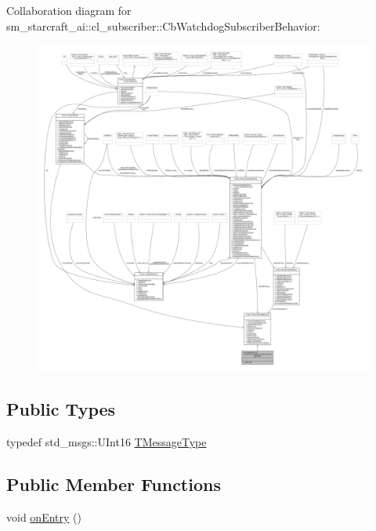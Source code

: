 Collaboration diagram for sm\+\_\+starcraft\+\_\+ai\+:\+:cl\+\_\+subscriber\+:\+:Cb\+Watchdog\+Subscriber\+Behavior\+:
\nopagebreak
\begin{figure}[H]
\begin{center}
\leavevmode
\includegraphics[width=350pt]{classsm__starcraft__ai_1_1cl__subscriber_1_1CbWatchdogSubscriberBehavior__coll__graph}
\end{center}
\end{figure}
\subsection*{Public Types}
\begin{DoxyCompactItemize}
\item 
typedef std\+\_\+msgs\+::\+U\+Int16 \hyperlink{classsm__starcraft__ai_1_1cl__subscriber_1_1CbWatchdogSubscriberBehavior_a0257cda4ee2d761bd71bbbdf8255be70}{T\+Message\+Type}
\end{DoxyCompactItemize}
\subsection*{Public Member Functions}
\begin{DoxyCompactItemize}
\item 
void \hyperlink{classsm__starcraft__ai_1_1cl__subscriber_1_1CbWatchdogSubscriberBehavior_a74aa8ecc420589bda47b90877bc120a7}{on\+Entry} ()
\end{DoxyCompactItemize}


